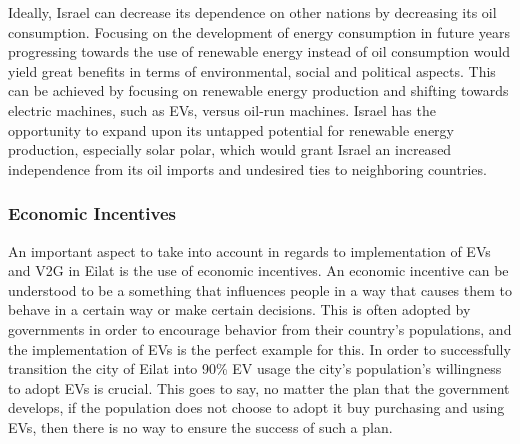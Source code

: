 \documentclass{article}                         %
\begin{document}
Ideally, Israel can decrease its dependence on other nations by decreasing its oil consumption. Focusing on the development of energy consumption in future years progressing towards the use of renewable energy instead of oil consumption would yield great benefits in terms of environmental, social and political aspects. This can be achieved by focusing on renewable energy production and shifting towards electric machines, such as EVs, versus oil-run machines. Israel has the opportunity to expand upon its untapped potential for renewable energy production, especially solar polar, which would grant Israel an increased independence from its oil imports and undesired ties to neighboring countries.

\subsubsection{Economic Incentives}
An important aspect to take into account in regards to implementation of EVs and V2G in Eilat is the use of economic incentives. An economic incentive can be understood to be a something that influences people in a way that causes them to behave in a certain way or make certain decisions. This is often adopted by governments in order to encourage behavior from their country’s populations, and the implementation of EVs is the perfect example for this. In order to successfully transition the city of Eilat into 90\% EV usage the city’s population’s willingness to adopt EVs is crucial. This goes to say, no matter the plan that the government develops, if the population does not choose to adopt it buy purchasing and using EVs, then there is no way to ensure the success of such a plan. 
\end{document}
